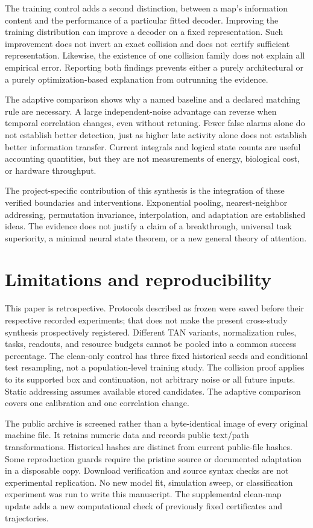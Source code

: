 \documentclass[
  10pt,
]{article}
\begin{document}
The training control adds a second distinction, between a map's
information content and the performance of a particular fitted decoder.
Improving the training distribution can improve a decoder on a fixed
representation. Such improvement does not invert an exact collision and
does not certify sufficient representation. Likewise, the existence of
one collision family does not explain all empirical error. Reporting
both findings prevents either a purely architectural or a purely
optimization-based explanation from outrunning the evidence.

The adaptive comparison shows why a named baseline and a declared
matching rule are necessary. A large independent-noise advantage can
reverse when temporal correlation changes, even without retuning. Fewer
false alarms alone do not establish better detection, just as higher
late activity alone does not establish better information transfer.
Current integrals and logical state counts are useful accounting
quantities, but they are not measurements of energy, biological cost, or
hardware throughput.

The project-specific contribution of this synthesis is the integration
of these verified boundaries and interventions. Exponential pooling,
nearest-neighbor addressing, permutation invariance, interpolation, and
adaptation are established ideas. The evidence does not justify a claim
of a breakthrough, universal task superiority, a minimal neural state
theorem, or a new general theory of attention.

\section{Limitations and
reproducibility}\label{limitations-and-reproducibility}

This paper is retrospective. Protocols described as frozen were saved
before their respective recorded experiments; that does not make the
present cross-study synthesis prospectively registered. Different TAN
variants, normalization rules, tasks, readouts, and resource budgets
cannot be pooled into a common success percentage. The clean-only
control has three fixed historical seeds and conditional test
resampling, not a population-level training study. The collision proof
applies to its supported box and continuation, not arbitrary noise or
all future inputs. Static addressing assumes available stored
candidates. The adaptive comparison covers one calibration and one
correlation change.

The public archive is screened rather than a byte-identical image of
every original machine file. It retains numeric data and records public
text/path transformations. Historical hashes are distinct from current
public-file hashes. Some reproduction guards require the pristine source
or documented adaptation in a disposable copy. Download verification and
source syntax checks are not experimental replication. No new model fit,
simulation sweep, or classification experiment was run to write this
manuscript. The supplemental clean-map update adds a new computational
check of previously fixed certificates and trajectories.
\end{document}
